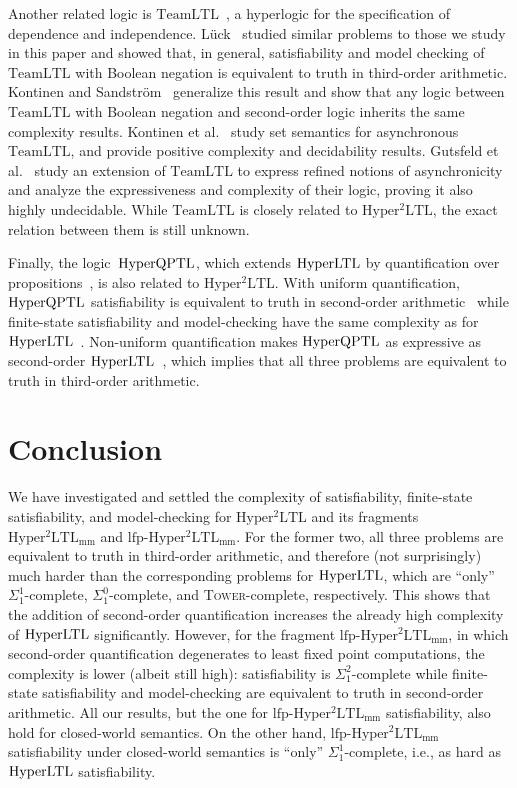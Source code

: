 \documentclass[dvipsnames,10pt,a4paper]{amsart}
\theoremstyle{definition}
\theoremstyle{remark}
\newcommand{\hyltl}{\mathrm{Hyper\-LTL}\xspace}
\newcommand{\hyqptl}{\mathrm{Hyper\-QPTL}\xspace}
\newcommand{\sohyltl}{\mathrm{Hyper^2LTL}\xspace}
\newcommand{\sohyltlfp}{\mathrm{Hyper^2LTL_{\mathrm{mm}}}\xspace}
\newcommand{\lfpsohyltlfp}{\mathrm{lfp\text{-}{Hyper^2LTL_{\mathrm{mm}}}}\xspace}
\newcommand{\teamltl}{\mathrm{TeamLTL}\xspace}
\newcommand{\tower}{\textsc{Tower}\xspace}
\newcommand{\myquot}[1]{``#1''}
\begin{document}
Another related logic is $\teamltl$~\cite{DBLP:conf/mfcs/KrebsMV018}, a hyperlogic for the specification of dependence and independence. Lück~\cite{Luck20} studied similar problems to those we study in this paper and showed that, in general, satisfiability and model checking of $\teamltl$ with Boolean negation is equivalent to truth in third-order arithmetic. Kontinen and Sandström~\cite{DBLP:conf/wollic/KontinenS21} generalize this result and show that any logic between $\teamltl$ with Boolean negation and second-order logic inherits the same complexity results. 
Kontinen et al.~\cite{DBLP:conf/mfcs/KontinenSV23} study set semantics for asynchronous $\teamltl$, and provide positive complexity and decidability results. Gutsfeld et al.~\cite{GutsfeldMOV22} study an extension of $\teamltl$ to express refined notions of asynchronicity and analyze the expressiveness and complexity of their logic, proving it also highly undecidable. 
While $\teamltl$ is closely related to $\sohyltl$, the exact relation between them is still unknown.

Finally, the logic~$\hyqptl$, which extends $\hyltl$ by quantification over propositions~\cite{Rabe16diss}, is also related to $\sohyltl$. 
With uniform quantification, $\hyqptl$ satisfiability is equivalent to truth in second-order arithmetic~\cite{regaud2024complexityhyperqptl} while finite-state satisfiability and model-checking have the same complexity as for $\hyltl$~\cite{FinkbeinerH16,Rabe16diss}. Non-uniform quantification makes $\hyqptl$ as expressive as second-order $\hyltl$~\cite{regaud2024complexityhyperqptl}, which implies that all three problems are equivalent to truth in third-order arithmetic.

\section{Conclusion}
\label{sec_conc}
We have investigated and settled the complexity of satisfiability, finite-state satisfiability, and model-checking for $\sohyltl$ and its fragments~$\sohyltlfp$ and $\lfpsohyltlfp$.
For the former two, all three problems are equivalent to truth in third-order arithmetic, and therefore (not surprisingly) much harder than the corresponding problems for $\hyltl$, which are \myquot{only} $\Sigma_1^1$-complete, $\Sigma_1^0$-complete, and \tower-complete, respectively.
This shows that the addition of second-order quantification increases the already high complexity of $\hyltl$ significantly. 
However, for the fragment $\lfpsohyltlfp$, in which second-order quantification degenerates to least fixed point computations, the complexity is lower (albeit still high): satisfiability is $\Sigma_1^2$-complete while finite-state satisfiability and model-checking are equivalent to truth in second-order arithmetic.
All our results, but the one for $\lfpsohyltlfp$ satisfiability, also hold for closed-world semantics. 
On the other hand, $\lfpsohyltlfp$ satisfiability under closed-world semantics is \myquot{only} $\Sigma_1^1$-complete, i.e., as hard as $\hyltl$ satisfiability. 
\end{document}
